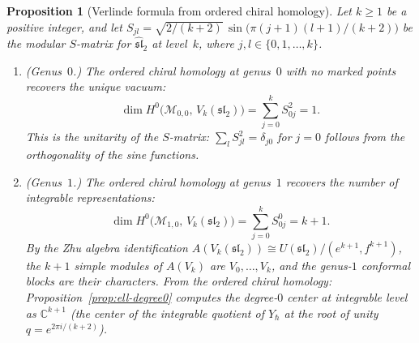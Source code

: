 \documentclass[11pt,reqno]{amsart}
\newtheorem{proposition}[theorem]{Proposition}
\theoremstyle{definition}
\theoremstyle{remark}
\newcommand{\cM}{\mathcal{M}}
\newcommand{\CC}{\mathbb{C}}
\numberwithin{equation}{section}
\begin{document}
\begin{proposition}[Verlinde formula from ordered chiral
homology]
\label{prop:verlinde-from-ordered}
Let $k \geq 1$ be a positive integer, and let
$S_{jl} = \sqrt{2/(k+2)}\,\sin\!\bigl(\pi(j+1)(l+1)/(k+2)\bigr)$
be the modular $S$-matrix for $\widehat{\mathfrak{sl}}_2$ at
level~$k$, where $j, l \in \{0, 1, \ldots, k\}$.
\begin{enumerate}[label=\textup{(\roman*)}]
\item \textup{(Genus~$0$.)}
  The ordered chiral homology at genus~$0$ with no marked
  points recovers the unique vacuum:
  \begin{equation}\label{eq:verlinde-g0}
    \dim H^0\!\bigl(\cM_{0,0},\, V_k(\mathfrak{sl}_2)\bigr)
    = \sum_{j=0}^{k} S_{0j}^2 = 1.
  \end{equation}
  This is the unitarity of the $S$-matrix:
  $\sum_l S_{jl}^2 = \delta_{j0}$ for $j = 0$ follows from
  the orthogonality of the sine functions.

\item \textup{(Genus~$1$.)}
  The ordered chiral homology at genus~$1$ recovers the
  number of integrable representations:
  \begin{equation}\label{eq:verlinde-g1}
    \dim H^0\!\bigl(\cM_{1,0},\, V_k(\mathfrak{sl}_2)\bigr)
    = \sum_{j=0}^{k} S_{0j}^0 = k + 1.
  \end{equation}
  By the Zhu algebra identification $A(V_k(\mathfrak{sl}_2))
  \cong U(\mathfrak{sl}_2)/(e^{k+1}, f^{k+1})$, the $k+1$
  simple modules of $A(V_k)$ are $V_0, \ldots, V_k$, and
  the genus-$1$ conformal blocks are their characters.
  From the ordered chiral homology:
  Proposition~\textup{\ref{prop:ell-degree0}} computes
  the degree-$0$ center at integrable level as $\CC^{k+1}$
  \textup{(}the center of the integrable quotient of $Y_\hbar$
  at the root of unity $q = e^{2\pi i/(k+2)}$\textup{)}.


\end{enumerate}
\end{proposition}
\end{document}
